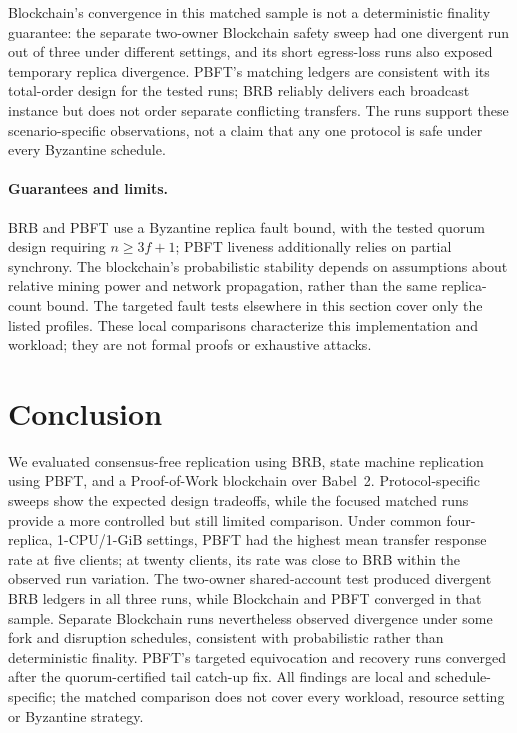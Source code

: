 \documentclass[sigconf,a4paper]{acmart}
\begin{document}
    Blockchain's convergence in this matched sample is not a deterministic
    finality guarantee: the separate two-owner Blockchain safety sweep had
    one divergent run out of three under different settings, and its short
    egress-loss runs also exposed temporary replica divergence. PBFT's matching
    ledgers are consistent with its total-order design for the tested runs;
    BRB reliably delivers each broadcast instance but does not order separate
    conflicting transfers. The runs support these scenario-specific
    observations, not a claim that any one protocol is safe under every
    Byzantine schedule.

    \paragraph{Guarantees and limits.}
    BRB and PBFT use a Byzantine replica fault bound, with the tested quorum
    design requiring $n\geq3f+1$; PBFT liveness additionally relies on partial
    synchrony. The blockchain's probabilistic stability depends on assumptions
    about relative mining power and network propagation, rather than the same
    replica-count bound. The targeted fault tests elsewhere in this section
    cover only the listed profiles. These local comparisons characterize this
    implementation and workload; they are not formal proofs or exhaustive
    attacks.

    \section{Conclusion}
    \label{sec:conclusion}

    We evaluated consensus-free replication using BRB, state machine replication
    using PBFT, and a Proof-of-Work blockchain over Babel~2. Protocol-specific
    sweeps show the expected design tradeoffs, while the focused matched runs
    provide a more controlled but still limited comparison. Under common
    four-replica, 1-CPU/1-GiB settings, PBFT had the highest mean transfer
    response rate at five clients; at twenty clients, its rate was close to
    BRB within the observed run variation. The two-owner shared-account test
    produced divergent BRB ledgers in all three runs, while Blockchain and
    PBFT converged in that sample. Separate Blockchain runs nevertheless
    observed divergence under some fork and disruption schedules, consistent
    with probabilistic rather than deterministic finality. PBFT's targeted
    equivocation and recovery runs converged after the quorum-certified tail
    catch-up fix. All findings are local and schedule-specific; the matched
    comparison does not cover every workload, resource setting or Byzantine
    strategy.

    
    
\end{document}
